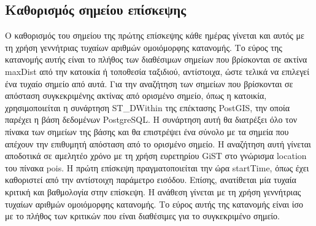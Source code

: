 \subsection{Καθορισμός σημείου επίσκεψης}

Ο καθορισμός του σημείου της πρώτης επίσκεψης κάθε ημέρας γίνεται και αυτός με τη χρήση γεννήτριας τυχαίων αριθμών ομοιόμορφης κατανομής. Το εύρος της κατανομής αυτής 
είναι το πλήθος των διαθέσιμων σημείων που βρίσκονται σε ακτίνα maxDist από την κατοικία ή τοποθεσία ταξιδιού, αντίστοιχα, ώστε τελικά να επιλεγεί ένα τυχαίο 
σημείο από αυτά. Για την αναζήτηση των σημείων που βρίσκονται σε απόσταση συγκεκριμένης ακτίνας από ορισμένο σημείο, όπως η κατοικία, χρησιμοποιείται η 
συνάρτηση ST\_DWithin της επέκτασης PostGIS, την οποία παρέχει η βάση δεδομένων PostgreSQL. Η συνάρτηση αυτή θα διατρέξει όλο τον πίνακα των σημείων της βάσης 
και θα επιστρέψει ένα σύνολο με τα σημεία που απέχουν την επιθυμητή απόσταση από το ορισμένο σημείο. Η αναζήτηση αυτή γίνεται αποδοτικά σε αμελητέο χρόνο με τη 
χρήση ευρετηρίου GiST στο γνώρισμα location του πίνακα pois. Η πρώτη επίσκεψη πραγματοποιείται την ώρα startTime, όπως έχει καθοριστεί από την αντίστοιχη 
παράμετρο εισόδου. Επίσης, ανατίθεται μία τυχαία κριτική και βαθμολογία στην επίσκεψη. Η ανάθεση γίνεται με τη χρήση γεννήτριας τυχαίων αριθμών 
ομοιόμορφης κατανομής. Το εύρος αυτής της κατανομής είναι ίσο με το πλήθος των κριτικών που είναι διαθέσιμες για το συγκεκριμένο σημείο. 








